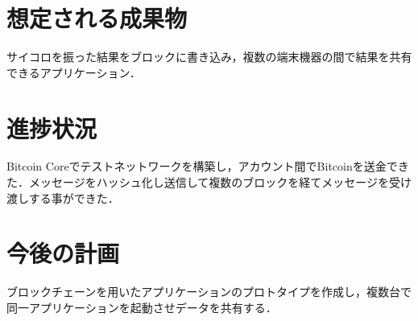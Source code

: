 \documentclass[uplatex,twocolumn,dvipdfmx]{jsarticle}
\begin{document}
\section{想定される成果物}
サイコロを振った結果をブロックに書き込み，複数の端末機器の間で結果を共有できるアプリケーション．

\section{進捗状況}
Bitcoin Coreでテストネットワークを構築し，アカウント間でBitcoinを送金できた．メッセージをハッシュ化し送信して複数のブロックを経てメッセージを受け渡しする事ができた．
\section{今後の計画}

ブロックチェーンを用いたアプリケーションのプロトタイプを作成し，複数台で同一アプリケーションを起動させデータを共有する．


\end{document}
